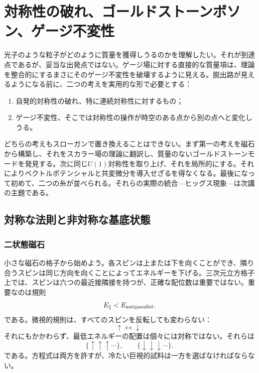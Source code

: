 \chapter{対称性の破れ、ゴールドストーンボソン、ゲージ不変性}

光子のような粒子がどのように質量を獲得しうるのかを理解したい。それが到達点であるが、妥当な出発点ではない。ゲージ場に対する直接的な質量項は、理論を整合的にするまさにそのゲージ不変性を破壊するように見える。脱出路が見えるようになる前に、二つの考えを実用的な形で必要とする：
\begin{enumerate}
  \item 自発的対称性の破れ、特に連続対称性に対するもの；
  \item ゲージ不変性、そこでは対称性の操作が時空のある点から別の点へと変化しうる。
\end{enumerate}
どちらの考えもスローガンで置き換えることはできない。まず第一の考えを磁石から構築し、それをスカラー場の理論に翻訳し、質量のないゴールドストーンモードを発見する。次に同じ\(U(1)\)対称性を取り上げ、それを局所的にする。それによりベクトルポテンシャルと共変微分を導入せざるを得なくなる。最後になって初めて、二つの糸が並べられる。それらの実際の統合---ヒッグス現象---は次講の主題である。

\section{対称な法則と非対称な基底状態}

\subsection{二状態磁石}

小さな磁石の格子から始めよう。各スピンは上または下を向くことができ、隣り合うスピンは同じ方向を向くことによってエネルギーを下げる。三次元立方格子上では、スピンは六つの最近接隣接を持つが、正確な配位数は重要ではない。重要なのは規則
\begin{equation}
  E_{\parallel}<E_{\rm antiparallel}.
\end{equation}
である。微視的規則は、すべてのスピンを反転しても変わらない：
\begin{equation}
  \uparrow\longleftrightarrow\downarrow.
\end{equation}
それにもかかわらず、最低エネルギーの配置は個々には対称ではない。それらは
\begin{equation}
  \{\uparrow\uparrow\uparrow\cdots\},
  \qquad
  \{\downarrow\downarrow\downarrow\cdots\}.
\end{equation}
である。方程式は両方を許すが、冷たい巨視的試料は一方を選ばなければならない。

